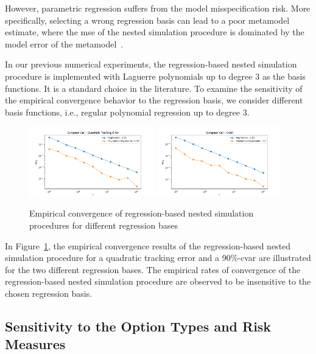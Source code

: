 However, parametric regression suffers from the model misspecification risk.
More specifically, selecting a wrong regression basis can lead to a poor metamodel estimate, where the \gls{mse} of the nested simulation procedure is dominated by the model error of the metamodel~\citep{broadie2015risk}.

In our previous numerical experiments, the regression-based nested simulation procedure is implemented with Laguerre polynomials up to degree $3$ as the basis functions.
It is a standard choice in the literature.
To examine the sensitivity of the empirical convergence behavior to the regression basis, we consider different basis functions, i.e., regular polynomial regression up to degree $3$.

\begin{figure}[ht!] 
    \centering
    \includegraphics[width=0.48\textwidth]{./project1/figures/figure13a.png}
    \includegraphics[width=0.48\textwidth]{./project1/figures/figure13b.png}
    \caption{Empirical convergence of regression-based nested simulation procedures for different regression bases}
\label{fig1:sens_basis}
\end{figure}

In Figure~\ref{fig1:sens_basis}, the empirical convergence results of the regression-based nested simulation procedure for a quadratic tracking error and a 90\%-\gls{cvar} are illustrated for the two different regression bases.
The empirical rates of convergence of the regression-based nested simulation procedure are observed to be insensitive to the chosen regression basis.

\subsection{Sensitivity to the Option Types and Risk Measures}\label{sec1:sensitivity-option-type}

